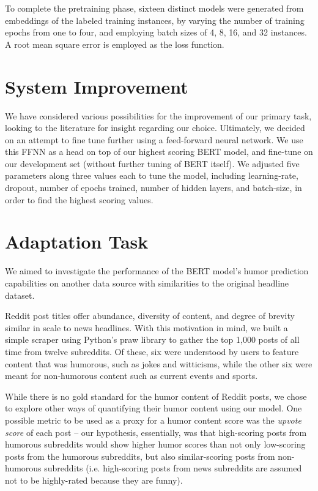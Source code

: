 \documentclass{article}
\begin{document}
To complete the pretraining phase, sixteen distinct models were generated from embeddings of the labeled training instances, by varying the number of training epochs from one to four, and employing batch sizes of 4, 8, 16, and 32 instances. A root mean square error is employed as the loss function.


\section{System Improvement}
We have considered various possibilities for the improvement of our primary task, looking to the literature for insight regarding our choice. Ultimately, we decided on an attempt to fine tune further using a feed-forward neural network. We use this FFNN as a head on top of our highest scoring BERT model, and fine-tune on our development set (without further tuning of BERT itself).  We adjusted five parameters along three values each to tune the model, including learning-rate, dropout, number of epochs trained, number of hidden layers, and batch-size, in order to find the highest scoring values.

\section{Adaptation Task}
We aimed to investigate the performance of the BERT model's humor prediction capabilities on another data source with similarities to the original headline dataset.

Reddit post titles offer abundance, diversity of content, and degree of brevity similar in scale to news headlines. With this motivation in mind, we built a simple scraper using Python's praw library to gather the top 1,000 posts of all time from twelve subreddits. Of these, six were understood by users to feature content that was humorous, such as jokes and witticisms, while the other six were meant for non-humorous content such as current events and sports.

While there is no gold standard for the humor content of Reddit posts, we chose to explore other ways of quantifying their humor content using our model. One possible metric to be used as a proxy for a humor content score was the \textit{upvote score} of each post -- our hypothesis, essentially, was that high-scoring posts from humorous subreddits would show higher humor scores than not only low-scoring posts from the humorous subreddits, but also similar-scoring posts from non-humorous subreddits (i.e. high-scoring posts from news subreddits are assumed not to be highly-rated because they are funny).
\end{document}
